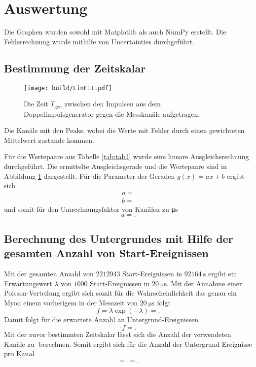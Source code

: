 \section{Auswertung}
\label{sec:Auswertung}


Die Graphen wurden sowohl mit Matplotlib \cite{matplotlib} als auch NumPy \cite{numpy} erstellt. Die
Fehlerrechnung wurde mithilfe von Uncertainties \cite{uncertainties} durchgeführt.


\subsection{Bestimmung der Zeitskalar}
\begin{figure}
	\centering
	\texttt{[image: build/LinFit.pdf]}
	\caption{Die Zeit $T_\text{gen}$ zwischen den Impulsen aus dem Doppelimpulsgenerator gegen die Messkanäle aufgetragen.}
	\label{fig:erste}
\end{figure}
\begin{table}
	\centering
	\caption{Die Kanäle mit den Peaks, wobei die Werte mit Fehler durch einen gewichteten Mittelwert zustande kommen.}
	
	\label{tab:b}
\end{table}
Für die Wertepaare aus Tabelle \ref{tab:tab1}  wurde eine lineare Ausgleichsrechnung durchgeführt. Die ermittelte Ausgleichsgerade und die Wertepaare sind in Abbildung \ref{fig:erste} dargestellt. Für die Parameter der Geraden $g(x)=a x + b$ ergibt sich
\begin{gather*}
a=\num{}\\
b=\num{}
\end{gather*}
und somit für den Umrechnungsfaktor von Kanälen zu \si{\micro\second}
\begin{displaymath}
u=\num{}.
\end{displaymath}

\subsection{Berechnung des Untergrundes mit Hilfe der gesamten Anzahl von Start-Ereignissen}
Mit der gesamten Anzahl von $\num{2212943}$ Start-Ereignissen in $\SI{92164}{\second}$ ergibt ein Erwartungswert $\lambda$ von $\num{1000}$ Start-Ereignissen in $\SI{20}{\micro\second}$. Mit der Annahme einer Poisson-Verteilung ergibt sich somit für die Wahrscheinlichkeit das genau ein Myon einem vorherigem in der Messzeit von $\SI{20}{\micro\second}$ folgt 
\begin{displaymath}
f=\lambda \exp(-\lambda)=\num{}.
\end{displaymath}
Damit folgt für die erwartete Anzahl an Untergrund-Ereignissen
\begin{displaymath}
\cdot f =\num{}.
\end{displaymath}
Mit der zuvor bestimmten Zeitskalar lässt sich die Anzahl der verwendeten Kanäle zu $\num{}$ berechnen.
Somit ergibt sich für die Anzahl der Untergrund-Ereignisse pro Kanal
\begin{displaymath}
=\frac{}{} =\num{}.
\end{displaymath}


